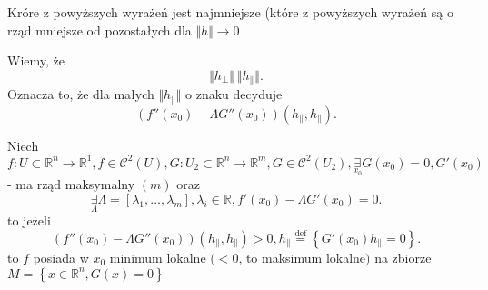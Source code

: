 \documentclass[../main.tex]{subfiles}
\begin{document}
\begin{pytanie}
    Króre z powyższych wyrażeń jest najmniejsze (które z powyższych wyrażeń są o rząd mniejsze od pozostałych dla $\Vert h \Vert \to 0$
\end{pytanie}

Wiemy, że
\[
\Vert h_\perp \Vert ~ \Vert h_\parallel \Vert
.\]
Oznacza to, że dla małych $\Vert h_\parallel \Vert$ o znaku decyduje \[
    (f''(x_0) - \Lambda G''(x_0))(h_\parallel,h_\parallel)
.\]

\begin{tw}
    Niech $f:U\subset \mathbb{R}^n \to \mathbb{R}^1, f\in \mathcal{C}^2(U), G: U_2\subset\mathbb{R}^n\to\mathbb{R}^m, G\in \mathcal{C}^2(U_2), \underset{x_0}{\exists} G(x_0) = 0, G'(x_0)$ - ma rząd maksymalny $(m)$ oraz \[
        \underset{\Lambda}{\exists} \Lambda = \left[ \lambda_1,\ldots,\lambda_m \right], \lambda_i \in \mathbb{R}, f'(x_0) - \Lambda G'(x_0) = 0
    .\] to jeżeli
    \[
        (f''(x_0)-\Lambda G''(x_0))(h_\parallel,h_\parallel) > 0,
        h_\parallel \overset{\text{def}}{=} \left \{G'(x_0) h_\parallel = 0 \right \}
    .\] to $f$ posiada w $x_0$ minimum lokalne $(<0$, to maksimum lokalne$)$ na zbiorze $M = \left\{ x\in \mathbb{R}^n, G(x) = 0 \right\} $
\end{tw}
\end{document}
